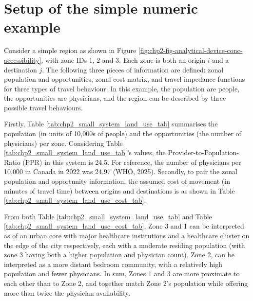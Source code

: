 \documentclass[
11pt, %
oneside, %
english, %
singlespacing, %
]{macthesis} %
\begin{document}
\section{Setup of the simple numeric example}\label{setup-of-the-simple-numeric-example}

Consider a simple region as shown in Figure \ref{fig:chp2-fig-analytical-device-conc-accessibility}, with zone IDs 1, 2 and 3. Each zone is both an origin \(i\) and a destination \(j\). The following three pieces of information are defined: zonal population and opportunities, zonal cost matrix, and travel impedance functions for three types of travel behaviour. In this example, the population are people, the opportunities are physicians, and the region can be described by three possible travel behaviours.





Firstly, Table \ref{tab:chp2_small_system_land_use_tab} summarises the population (in units of 10,000s of people) and the opportunities (the number of physicians) per zone. Considering Table \ref{tab:chp2_small_system_land_use_tab}'s values, the Provider-to-Population-Ratio (PPR) in this system is 24.5. For reference, the number of physicians per 10,000 in Canada in 2022 was 24.97 (WHO, 2025). Secondly, to pair the zonal population and opportunity information, the assumed cost of movement (in minutes of travel time) between origins and destinations is as shown in Table \ref {tab:chp2_small_system_land_use_cost_tab}.

From both Table \ref{tab:chp2_small_system_land_use_tab} and Table \ref {tab:chp2_small_system_land_use_cost_tab}, Zone 3 and 1 can be interpreted as of an urban core with major healthcare institutions and a healthcare cluster on the edge of the city respectively, each with a moderate residing population (with zone 3 having both a higher population and physician count). Zone 2, can be interpreted as a more distant bedroom community, with a relatively high population and fewer physicians. In sum, Zones 1 and 3 are more proximate to each other than to Zone 2, and together match Zone 2's population while offering more than twice the physician availability.
\end{document}
